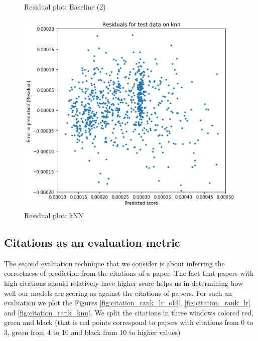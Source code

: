 \documentclass[a4paper, 11pt]{article}
\begin{document}
\begin{figure}[!htb]
    \caption{Residual plot: Baseline (2)}
    \label{fig:residual_second_baseline}
\endminipage\hfill
{}%
  \includegraphics[width=\linewidth]{residual_knn.png}
    \caption{Residual plot: kNN}
  \label{fig:residual_knn}
\endminipage
\end{figure}




%
%


\subsection{Citations as an evaluation metric}

The second evaluation technique that we consider is about inferring the correctness of prediction from the citations of a paper. The fact that papers with high citations should relatively have higher score helps us in determining how well our models are scoring as against the citations of papers. For such an evaluation we plot the Figures \ref{fig:citation_rank_lr_old}, \ref{fig:citation_rank_lr} and \ref{fig:citation_rank_knn}. We split the citations in three windows colored red, green and black (that is red points correspond to papers with citations from 0 to 3, green from 4 to 10 and black from 10 to higher values)
\end{document}
